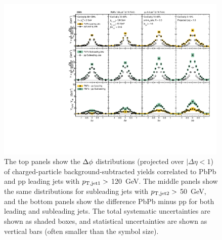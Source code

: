 \begin{figure}[hbtp]
\begin{center}
\includegraphics[width=0.99\textwidth]{figures/Results/PAS_Figure_6_TrkPt1_TrkPt2.pdf}
     \caption[Dijet $\Delta\phi$ correlations for tracks with $1 < p_{\rm T}^{\rm trk} < 2$ GeV at 2.76 TeV]{The top panels show the $\protect\Delta\phi$ distributions (projected over $|\Delta\eta < 1$) of charged-particle background-subtracted yields correlated to PbPb and pp leading jets with $p_{\rm T, jet1}>$ 120~GeV.  The middle panels show the same distributions for subleading jets with $p_{\rm T, jet2}>$ 50~GeV, and the bottom panels show the difference PbPb minus pp for both leading and subleading jets. The total systematic uncertainties are shown as shaded boxes, and statistical uncertainties are shown as vertical bars (often smaller than the symbol size).}
      \label{fig:fig2_dPhi1}
   \end{center}
\end{figure}

